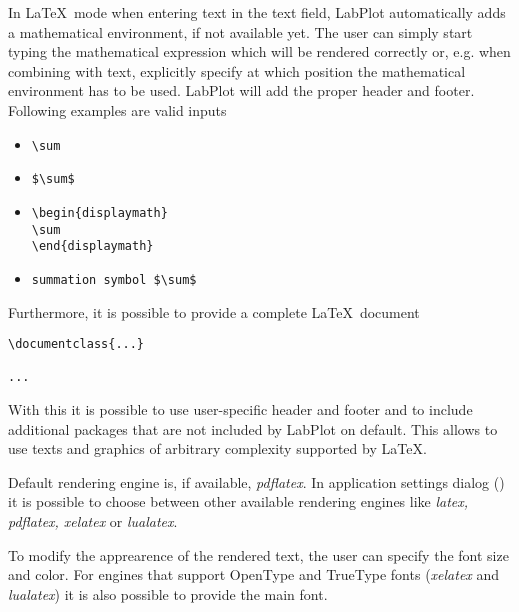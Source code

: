 In \LaTeX\, mode when entering text in the text field, LabPlot automatically adds a mathematical environment, if not available yet. The user can simply start typing the mathematical expression which will be rendered correctly or, e.g. when combining with text, explicitly specify at which position the mathematical environment has to be used. LabPlot will add the proper header and footer. Following examples are valid inputs
\begin{itemize}
\item {
\begin{lstlisting}
\sum
\end{lstlisting}
}
%
\item {
\begin{lstlisting}
$\sum$
\end{lstlisting}
}
%
\item {
\begin{lstlisting}
\begin{displaymath}
\sum
\end{displaymath}
\end{lstlisting}
}
%
\item {
\begin{lstlisting}
summation symbol $\sum$
\end{lstlisting}
}
\end{itemize}
Furthermore, it is possible to provide a complete \LaTeX\, document
\begin{lstlisting}[language={[Latex]TeX}, backgroundcolor=\color{lightgray}, frame=single]
\documentclass{...}

...

\end{lstlisting}

With this it is possible to use user-specific header and footer and to include additional packages that are not included by LabPlot on default. This allows to use texts and graphics of arbitrary complexity supported by \LaTeX.

Default rendering engine is, if available, \textit{pdflatex}. In application settings dialog () it is possible to choose between other available rendering engines like \textit{latex, pdflatex, xelatex} or \textit{lualatex}.

To modify the apprearence of the rendered text, the user can specify the font size and color. For engines that support OpenType and TrueType fonts (\textit{xelatex} and \textit{lualatex}) it is also possible to provide the main font.


